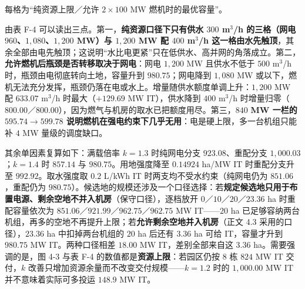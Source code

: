 \noindent 每格为“纯资源上限／允许 $2\times100$ MW 燃机时的最优容量”。

由表 F-4 可以读出三点。第一，\textbf{纯资源口径下只有供水 $300$ m$^3$/h 的三格（网电 $960$、$1{,}080$、$1{,}200$ MW）与 $1{,}200$ MW 配 $400$ m$^3$/h 这一格由水先触顶}，其余全部由电先触顶；这说明“水比电更紧”只在低供水、高并网的角落成立。第二，\textbf{允许燃机后瓶颈是否转移取决于网电}：网电 $1{,}200$ MW 且供水不低于 $500$ m$^3$/h 时，瓶颈由电彻底转向土地，容量升到 $980.75$；网电降到 $1{,}080$ MW 或以下，燃机无法充分发挥，瓶颈仍落在电或水上。增量随供水额度单调上升：$1{,}200$ MW 配 $633.07$ m$^3$/h 时最大（$+129.69$ MW IT），供水降到 $400$ m$^3$/h 时增量归零（$800.00$／$800.00$），因为燃气与机房的取水已把额度用尽。第三，$840$\textbf{ MW 一栏的 $595.74\to599.78$ 说明燃机在强电约束下几乎无用}：电是硬上限，多一台机组只能补 $4$ MW 量级的调度缺口。

其余单因素复算如下：满载倍率 $k=1.3$ 时纯网电分支 $923.08$、重配分支 $1{,}000.03$；$k=1.4$ 时 $857.14$ 与 $980.75$。用地强度降至 $0.14924$ ha/MW IT 时重配分支升至 $992.92$。取水强度取 $0.2$ L/kWh IT 时两支均不受水约束（纯网电仍为 $851.06$，重配仍为 $980.75$）。候选地的规模还涉及一个口径选择：若\textbf{规定候选地只用于布置电源、剩余空地不并入机房}（保守口径），逐档放开 $0$／$10$／$20$／$23.36$ ha 时重配容量依次为 $851.06$／$921.99$／$962.75$／$962.75$ MW IT——$20$ ha 已足够容纳两台机组，再多的空地不再提升上限；若\textbf{允许剩余空地并入机房}（正文 4.3 采用的口径），$23.36$ ha 中扣掉两台机组的 $20$ ha 后还有 $3.36$ ha 可给 IT，容量才升到 $980.75$ MW IT。两种口径相差 $18.00$ MW IT，差别全部来自这 $3.36$ ha。需要强调的是，图 4-3 与表 F-4 的数值都是\textbf{资源上限}：若园区仍按 8 栋 $824$ MW IT 交付，$k$ 改善只增加资源余量而不改变交付规模——$k=1.2$ 时的 $1{,}000.00$ MW IT 并不意味着实际可多投运 $148.9$ MW IT。


